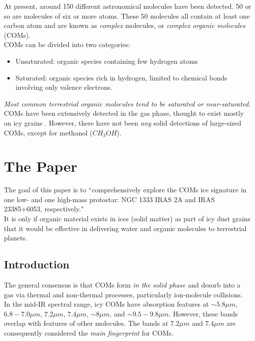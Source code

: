 \documentclass[svgnames]{article}     %
\begin{document}
At present, around 150 different astronomical molecules have been detected. 50
or so are molecules of six or more atoms. These 50 molecules all contain at
least one carbon atom and are known as \textit{complex} molecules, or
\textit{complex organic molecules} (COMs). \\

COMs can be divided into two categories: 

\begin{itemize}
  \item[-] Unsaturated: organic species containing few hydrogen atoms 
    \item[-] Saturated: organic species rich in hydrogen, limited to chemical
      bonds involving only valence electrons. 
\end{itemize}

\textit{Most common terrestrial organic molecules tend to be saturated or
near-saturated.} \\

COMs have been extensively detected in the gas phase, thought to exist mostly
on icy grains . However, there have not been \textit{any} solid detections of
large-sized COMs, except for methanol ($CH_3OH$). 

\section{The Paper}

The goal of this paper is to ``comprehensively explore the COMs ice signature
in one low- and one high-mass protostar: NGC 1333 IRAS 2A and IRAS 23385+6053,
respectively."\\

It is only if organic material exists in ices (solid matter) as part of icy
dust grains that it would be effective in delivering water and organic
molecules to terrestrial planets. 

\subsection{Introduction}

The general consensus is that COMs form \textit{in the solid phase} and desorb
into a gas via thermal and non-thermal processes, particularly ion-molecule
collisions. \\

In the mid-IR spectral range, icy COMs have absorption features at $\sim 5.8\mu
m$, $6.8-7.0\mu m$, $7.2\mu m$, $7.4\mu m$, $\sim 8\mu m$, and $\sim 9.5-9.8\mu
m$. However, these bands overlap with features of other molecules. The bands at
$7.2\mu m$ and $7.4\mu m$ are consequently considered the \textit{main
fingerprint} for COMs. \\
\end{document}
